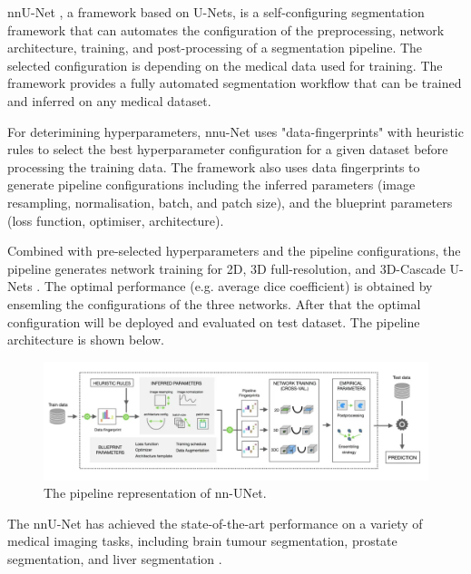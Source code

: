 \noindent nnU-Net \cite{isensee2021nnu}, a framework based on U-Nets, is a self-configuring segmentation framework that can automates the configuration of the preprocessing, network architecture, training, and post-processing of a segmentation pipeline. The selected configuration is depending on the medical data used for training. The framework provides a fully automated segmentation workflow that can be trained and inferred on any medical dataset. \medskip

\noindent For deterimining hyperparameters, nnu-Net uses "data-fingerprints" with heuristic rules to select the best hyperparameter configuration for a given dataset before processing the training data. The framework also uses data fingerprints to generate pipeline configurations including the inferred parameters (image resampling, normalisation, batch, and patch size), and the blueprint parameters (loss function, optimiser, architecture). \medskip

\noindent Combined with pre-selected hyperparameters and the pipeline configurations, the pipeline generates network training for 2D, 3D full-resolution, and 3D-Cascade U-Nets \cite{isensee2018nnu}. The optimal performance (e.g. average dice coefficient) is obtained by ensemling the configurations of the three networks. After that the optimal configuration will be deployed and evaluated on test dataset. The pipeline architecture is shown below. \medskip

\begin{figure}[H]
    \centering
    \includegraphics[width=\textwidth]{./figures/nnunet.png}
    \caption{The pipeline representation of nn-UNet.}
    \label{fig:hello}
\end{figure}
\noindent The nnU-Net has achieved the state-of-the-art performance on a variety of medical imaging tasks, including brain tumour segmentation, prostate segmentation, and liver segmentation \cite{isensee2019nnu}. \medskip







